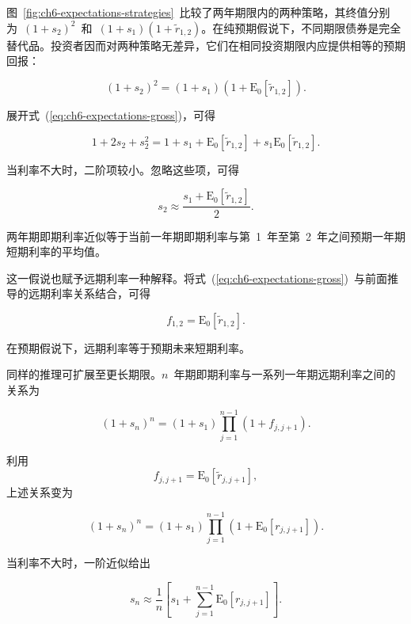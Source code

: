 图~\ref{fig:ch6-expectations-strategies}~比较了两年期限内的两种策略，其终值分别为~$(1+s_2)^2$~和~$(1+s_1)(1+\widetilde{r}_{1,2})$。在纯预期假说下，不同期限债券是完全替代品。投资者因而对两种策略无差异，它们在相同投资期限内应提供相等的预期回报：

\begin{equation}
(1+s_2)^2=(1+s_1)
\left(1+\mathrm{E}_0[\widetilde{r}_{1,2}]\right).
\label{eq:ch6-expectations-gross}
\end{equation}

展开式~(\ref{eq:ch6-expectations-gross})，可得

\[
1+2s_2+s_2^2
=
1+s_1+\mathrm{E}_0[\widetilde{r}_{1,2}]
+s_1\mathrm{E}_0[\widetilde{r}_{1,2}].
\]

当利率不大时，二阶项较小。忽略这些项，可得

\begin{equation}
s_2
\approx
\frac{s_1+\mathrm{E}_0[\widetilde{r}_{1,2}]}{2}.
\label{eq:ch6-expectations-two-year}
\end{equation}

两年期即期利率近似等于当前一年期即期利率与第~1~年至第~2~年之间预期一年期短期利率的平均值。

这一假说也赋予远期利率一种解释。将式~(\ref{eq:ch6-expectations-gross})~与前面推导的远期利率关系结合，可得

\begin{equation}
f_{1,2}
=
\mathrm{E}_0[\widetilde{r}_{1,2}].
\label{eq:ch6-forward-expectation}
\end{equation}

在预期假说下，远期利率等于预期未来短期利率。

同样的推理可扩展至更长期限。$n$~年期即期利率与一系列一年期远期利率之间的关系为

\begin{equation}
(1+s_n)^n
=
(1+s_1)
\prod_{j=1}^{n-1}
(1+f_{j,j+1}).
\label{eq:ch6-spot-forward-general}
\end{equation}

利用
\[
f_{j,j+1}
=
\mathrm{E}_0[\widetilde{r}_{j,j+1}],
\]
上述关系变为

\begin{equation}
(1+s_n)^n
=
(1+s_1)
\prod_{j=1}^{n-1}
\left(1+\mathrm{E}_0[r_{j,j+1}]\right).
\label{eq:ch6-expectations-general-gross}
\end{equation}

当利率不大时，一阶近似给出

\begin{equation}
s_n
\approx
\frac{1}{n}
\left[
s_1
+
\sum_{j=1}^{n-1}
\mathrm{E}_0[r_{j,j+1}]
\right].
\label{eq:ch6-expectations-general}
\end{equation}


